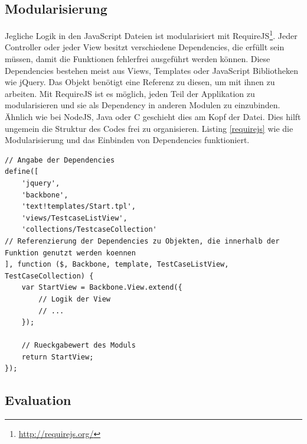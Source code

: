 \subsection{Modularisierung}

Jegliche Logik in den JavaScript Dateien ist modularisiert mit RequireJS\footnote{\url{http://requirejs.org/}}. Jeder Controller oder jeder View besitzt verschiedene Dependencies, die erfüllt sein müssen, damit die Funktionen fehlerfrei ausgeführt werden können. Diese Dependencies bestehen meist aus Views, Templates oder JavaScript Bibliotheken wie jQuery. Das Objekt benötigt eine Referenz zu diesen, um mit ihnen zu arbeiten. Mit RequireJS ist es möglich, jeden Teil der Applikation zu modularisieren und sie als Dependency in anderen Modulen zu einzubinden. Ähnlich wie bei NodeJS, Java oder C geschieht dies am Kopf der Datei. Dies hilft ungemein die Struktur des Codes frei zu organisieren. Listing \ref{requirejs} wie die Modularisierung und das Einbinden von Dependencies funktioniert.

\vspace{1cm}
\begin{lstlisting}[caption=Modularisierung mit RequireJS,label=requirejs]
// Angabe der Dependencies
define([
    'jquery',
    'backbone',
    'text!templates/Start.tpl',
    'views/TestcaseListView',
    'collections/TestcaseCollection'
// Referenzierung der Dependencies zu Objekten, die innerhalb der Funktion genutzt werden koennen
], function ($, Backbone, template, TestCaseListView, TestCaseCollection) {
    var StartView = Backbone.View.extend({
        // Logik der View
        // ...
    });

    // Rueckgabewert des Moduls
    return StartView;
});
\end{lstlisting}
\vspace{0.5cm}


\subsection{Evaluation}
\label{evaluation}

